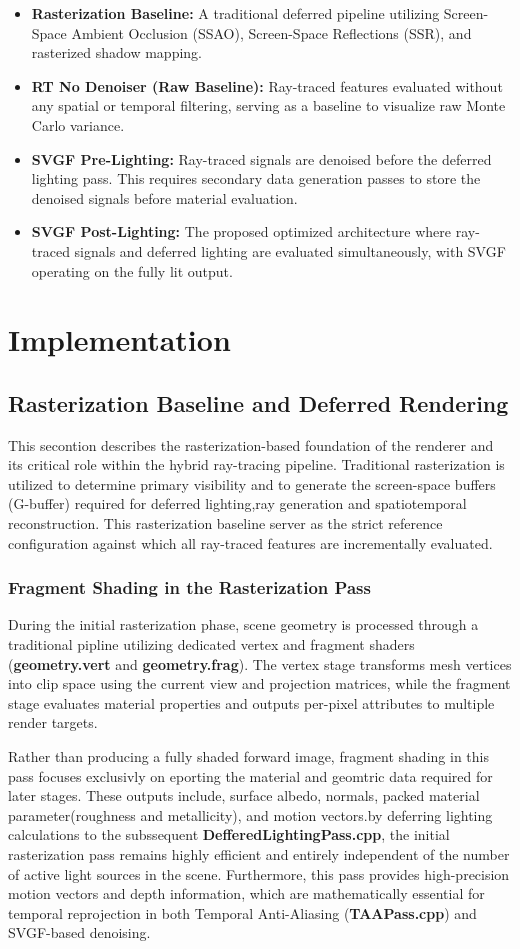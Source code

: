 \documentclass[12pt,a4paper]{report}
\newcommand{\daechapter}[1]{
  \chapter{#1}
}
\newcommand{\daesection}[1]{
  \section{#1}
}
\begin{document}
\begin{itemize}
    \item \textbf{Rasterization Baseline:} A traditional deferred pipeline utilizing Screen-Space Ambient Occlusion (SSAO), Screen-Space Reflections (SSR), and rasterized shadow mapping.
    \item \textbf{RT No Denoiser (Raw Baseline):} Ray-traced features evaluated without any spatial or temporal filtering, serving as a baseline to visualize raw Monte Carlo variance.
    \item \textbf{SVGF Pre-Lighting:} Ray-traced signals are denoised before the deferred lighting pass. This requires secondary data generation passes to store the denoised signals before material evaluation.
    \item \textbf{SVGF Post-Lighting:} The proposed optimized architecture where ray-traced signals and deferred lighting are evaluated simultaneously, with SVGF operating on the fully lit output.
\end{itemize}
\daechapter{Implementation}

\daesection{Rasterization Baseline and Deferred Rendering}
This secontion describes the rasterization-based foundation of the renderer and its critical role within the hybrid ray-tracing pipeline.
Traditional rasterization is utilized to determine primary visibility and to generate the screen-space buffers (G-buffer) required for deferred lighting,ray generation and spatiotemporal reconstruction.
This rasterization baseline server as the strict reference configuration against which all ray-traced features are incrementally evaluated.%

\subsection{Fragment Shading in the Rasterization Pass}
During the initial rasterization phase, scene geometry is processed through a traditional pipline utilizing dedicated vertex and fragment shaders (\textbf{geometry.vert} and \textbf{geometry.frag}). 
The vertex stage transforms mesh vertices into clip space using the current view and projection matrices, while the fragment stage evaluates material properties and outputs per-pixel attributes to multiple render targets.

Rather than producing a fully shaded forward image, fragment shading in this pass focuses exclusivly on eporting the material and geomtric data required for later stages. These outputs include, surface albedo, normals, packed material parameter(roughness and metallicity),
and motion vectors.by deferring lighting calculations to the subssequent \textbf{DefferedLightingPass.cpp}, the initial rasterization pass remains highly efficient and entirely independent of the number of active light sources in the scene. Furthermore,
this pass provides high-precision motion vectors and depth information, which are mathematically essential for temporal reprojection in both Temporal Anti-Aliasing (\textbf{TAAPass.cpp}) and SVGF-based denoising.
\end{document}

